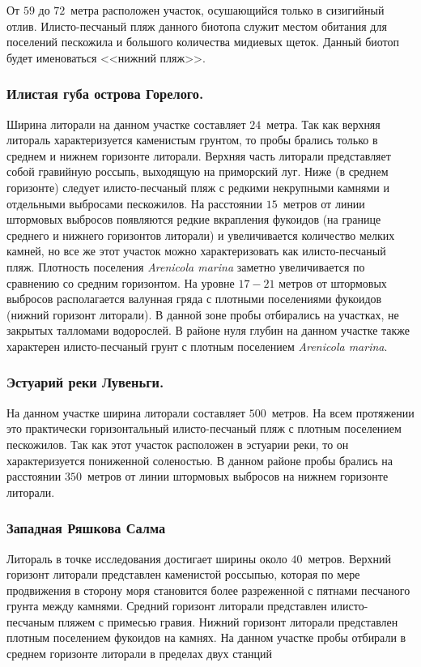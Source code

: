 От $59$ до $72$~метра расположен участок, осушающийся только в сизигийный отлив. 
Илисто-песчаный пляж данного биотопа служит местом обитания для поселений пескожила и большого количества мидиевых щеток. 
Данный биотоп будет именоваться <<нижний пляж>>. 


\subsubsection{Илистая губа острова Горелого.}
Ширина литорали на данном участке составляет $24$~метра. 
Так как верхняя литораль характеризуется каменистым грунтом, то пробы брались только в среднем и нижнем горизонте литорали.
Верхняя часть литорали представляет собой гравийную россыпь, выходящую на приморский луг. 
Ниже (в среднем горизонте) следует илисто-песчаный пляж с редкими некрупными камнями и отдельными выбросами пескожилов.  
На расстоянии $15$~метров от линии штормовых выбросов появляются редкие вкрапления фукоидов (на границе среднего и нижнего горизонтов литорали) и увеличивается количество мелких камней, но  все же этот участок можно характеризовать как илисто-песчаный пляж. 
Плотность поселения {\it Arenicola marina} заметно увеличивается по сравнению со средним горизонтом.
На уровне $17-21$ метров от штормовых выбросов располагается валунная гряда с плотными поселениями фукоидов (нижний горизонт литорали). 
В данной зоне пробы отбирались на участках, не закрытых талломами водорослей. 
В районе нуля глубин на данном участке также характерен илисто-песчаный грунт с плотным поселением {\it Arenicola marina}.


\subsubsection{Эстуарий реки Лувеньги.}
На данном участке ширина литорали составляет $500$~метров. 
На всем протяжении это практически горизонтальный илисто-песчаный пляж с плотным поселением пескожилов. 
Так как этот участок расположен в эстуарии реки, то он характеризуется пониженной соленостью. 
В данном районе пробы брались на расстоянии $350$~метров от линии штормовых выбросов на нижнем горизонте литорали.

\subsubsection{Западная Ряшкова Салма}
Литораль в точке исследования достигает ширины около $40$~метров.
Верхний горизонт литорали представлен каменистой россыпью, которая по мере продвижения в сторону моря становится более разреженной с пятнами песчаного грунта между камнями.
Средний горизонт литорали представлен илисто-песчаным пляжем с примесью гравия.
Нижний горизонт литорали представлен плотным поселением фукоидов на камнях.
На данном участке пробы отбирали в среднем горизонте литорали в пределах двух станций


